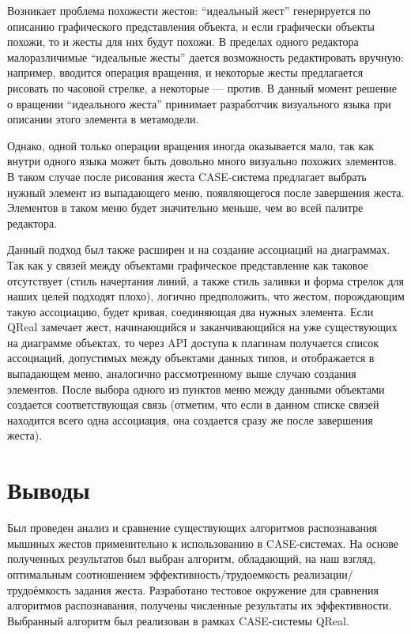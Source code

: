 \documentclass[a5paper]{article}
\begin{document}
Возникает проблема похожести жестов: ``идеальный жест'' генерируется по описанию графического представления объекта, и если графически 
объекты похожи, то и жесты для них будут похожи. В пределах одного редактора малоразличимые ``идеальные жесты'' дается возможность редактировать 
вручную: например, вводится операция вращения, и некоторые жесты предлагается рисовать по часовой стрелке, а некоторые --- против. В данный 
момент решение о вращении ``идеального жеста'' принимает разработчик визуального языка при описании этого элемента 
в метамодели. 

Однако, одной только операции вращения иногда оказывается мало, так как внутри одного языка может быть довольно много
визуально похожих элементов. В таком случае после рисования жеста CASE-система предлагает выбрать нужный элемент из выпадающего меню, 
появляющегося после завершения жеста. Элементов в таком меню будет значительно меньше, чем во всей палитре редактора.

Данный подход был также расширен и на создание ассоциаций на диаграммах. Так как у связей между объектами графическое представление
как таковое отсутствует (стиль начертания линий, а также стиль заливки и форма стрелок для наших целей подходят плохо), логично 
предположить, что жестом, порождающим такую ассоциацию, будет кривая, соединяющая два нужных элемента. Если QReal замечает жест,
начинающийся и заканчивающийся на уже существующих на диаграмме объектах, то через API доступа к плагинам получается список 
ассоциаций, допустимых между объектами данных типов, и отображается в выпадающем меню, аналогично рассмотренному выше случаю создания 
элементов. После выбора одного из пунктов меню между данными объектами создается соответствующая связь 
(отметим, что если в данном списке связей находится всего одна ассоциация, она создается сразу же после завершения жеста).

\section{Выводы}

Был проведен анализ и сравнение существующих алгоритмов распознавания мышиных жестов применительно к использованию в CASE-системах. 
На основе полученных результатов был выбран алгоритм, обладающий, на наш взгляд, оптимальным соотношением эффективность/трудоемкость реализации/трудоёмкость задания жеста.
Разработано тестовое окружение для сравнения алгоритмов распознавания, получены численные результаты их эффективности.
Выбранный алгоритм был реализован в рамках CASE-системы QReal. 
\end{document}
